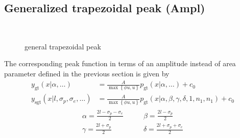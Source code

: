 \subsection{Generalized trapezoidal peak (Ampl)} ~\\

\begin{figure}[htb]
\captionsetup[subfigure]{position=b}
\centering
{}
\hfill
{}
\caption{general trapezoidal peak}
\end{figure}

\label{sec:generalizedtrapezoidalAmpl}
The corresponding peak function in terms of an amplitude instead of area parameter defined in the previous section is given by
\begin{align}\label{eq:generalizedtrapezoidalpeakAmpl}
y_\mathrm{gt}(x|\alpha,\ldots) &= \frac{A}{\max\left\{\phi u,u\right\}}\textstyle p_\mathrm{gt}(x|\alpha,\ldots) +c_0 \\
y_\mathrm{sgt}(x|l,\sigma_p,\sigma_e,\ldots) &= \frac{A}{\max\left\{\phi u,u\right\}} \textstyle p_\mathrm{gt}\left(x|\alpha,\beta,\gamma,\delta,1,n_1,n_1\right) +c_0
\end{align}
\begin{align}
\begin{array}{ll}
\displaystyle\alpha = \frac{2l-\sigma_p-\sigma_e}{2} & \displaystyle\qquad \beta  = \frac{2l-\sigma_p}{2} \\
\displaystyle\gamma = \frac{2l+\sigma_p}{2}          & \displaystyle\qquad \delta = \frac{2l+\sigma_p+\sigma_e}{2}
\end{array}
\end{align}

